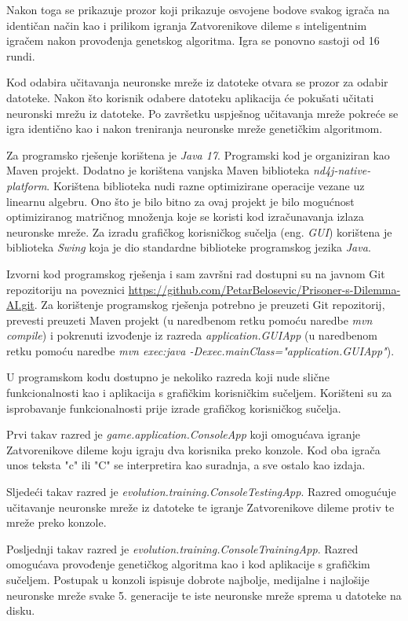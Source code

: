 \documentclass[zavrsnirad]{fer}
\begin{document}
	Nakon toga se prikazuje prozor koji prikazuje osvojene bodove svakog igrača na identičan način kao i prilikom igranja Zatvorenikove dileme s inteligentnim igračem nakon provođenja genetskog algoritma. Igra se ponovno sastoji od 16 rundi.
	
	Kod odabira učitavanja neuronske mreže iz datoteke otvara se prozor za odabir datoteke. Nakon što korisnik odabere datoteku aplikacija će pokušati učitati neuronski mrežu iz datoteke. Po završetku uspješnog učitavanja mreže pokreće se igra identično kao i nakon treniranja neuronske mreže genetičkim algoritmom.
	
	Za programsko rješenje korištena je \textit{Java 17}. Programski kod je organiziran kao Maven projekt. Dodatno je korištena vanjska Maven biblioteka \textit{nd4j-native-platform}. Korištena biblioteka nudi razne optimizirane operacije vezane uz linearnu algebru. Ono što je bilo bitno za ovaj projekt je bilo mogućnost optimiziranog matričnog množenja koje se koristi kod izračunavanja izlaza neuronske mreže. Za izradu grafičkog korisničkog sučelja (eng. \textit{GUI}) korištena je biblioteka \textit{Swing} koja je dio standardne biblioteke programskog jezika \textit{Java}.
	
	Izvorni kod programskog rješenja i sam završni rad dostupni su na javnom Git repozitoriju na poveznici  \href{https://github.com/PetarBelosevic/Prisoner-s-Dilemma-AI.git}{https://github.com/PetarBelosevic/Prisoner-s-Dilemma-AI.git}. Za korištenje programskog rješenja potrebno je preuzeti Git repozitorij, prevesti preuzeti Maven projekt (u naredbenom retku pomoću naredbe \textit{mvn compile}) i pokrenuti izvođenje iz razreda \textit{application.GUIApp} (u naredbenom retku pomoću naredbe \textit{mvn exec:java -Dexec.mainClass="application.GUIApp"}).
	
	U programskom kodu dostupno je nekoliko razreda koji nude slične funkcionalnosti kao i aplikacija s grafičkim korisničkim sučeljem. Korišteni su za isprobavanje funkcionalnosti prije izrade grafičkog korisničkog sučelja.
	
	Prvi takav razred je \textit{game.application.ConsoleApp} koji omogućava igranje Zatvorenikove dileme koju igraju dva korisnika preko konzole. Kod oba igrača unos teksta "c" ili "C" se interpretira kao suradnja, a sve ostalo kao izdaja.
	
	Sljedeći takav razred je \textit{evolution.training.ConsoleTestingApp}. Razred omogućuje učitavanje neuronske mreže iz datoteke te igranje Zatvorenikove dileme protiv te mreže preko konzole.
	
	Posljednji takav razred je \textit{evolution.training.ConsoleTrainingApp}. Razred omogućava provođenje genetičkog algoritma kao i kod aplikacije s grafičkim sučeljem. Postupak u konzoli ispisuje dobrote najbolje, medijalne i najlošije neuronske mreže svake 5. generacije te iste neuronske mreže sprema u datoteke na disku.

\end{document}
